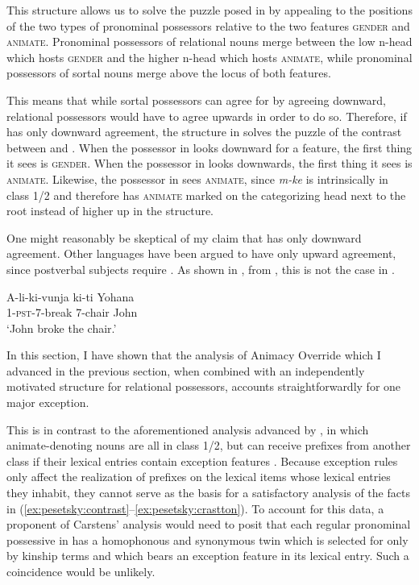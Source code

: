 \documentclass[output=paper,newtxmath,modfonts,nonflat,hidelinks]{langsci/langscibook}
\begin{document}
This structure allows us to solve the puzzle posed in  by appealing to the positions of the two types of pronominal possessors relative to the two features \textsc{gender} and \textsc{animate}. Pronominal possessors of relational nouns merge between the low n-head which hosts \textsc{gender} and the higher n-head which hosts \textsc{animate}, while pronominal possessors of sortal nouns merge above the locus of both features. 

This means that while sortal possessors can agree for  by agreeing downward, relational possessors would have to agree upwards in order to do so.  Therefore, if  has only downward agreement, the structure in  solves the puzzle of the contrast between  and . When the possessor in  looks downward for a  feature, the first thing it sees is \textsc{gender}.  When the possessor in  looks downwards, the first thing it sees is \textsc{animate}.  Likewise, the possessor in  sees \textsc{animate}, since \textit{m-ke} is intrinsically in class 1/2 and therefore has \textsc{animate} marked on the categorizing head next to the root instead of higher up in the structure. 

One might reasonably be skeptical of my claim that  has only downward agreement.  Other  languages have been argued to have only upward agreement, since postverbal subjects require . As shown in , from \citet{taniguchi13}, this is not the case in .

\ea\label{ex:pesetsky:realagreement}
{ \gll A-li-ki-vunja ki-ti Yohana \\
 \textsc{1}-\textsc{pst}-\textsc{7}-break \textsc{7}-chair John 
 \\ \glt `John broke the chair.' } \z 


In this section, I have shown that the analysis of Animacy Override which I advanced in the previous section, when combined with an independently motivated structure for relational possessors, accounts straightforwardly for one major exception.  

This is in contrast to the aforementioned analysis advanced by \citet{carstens91}, in which animate-denoting nouns are all in class 1/2, but can receive prefixes from another class if their lexical entries contain exception features .  Because exception rules only affect the realization of prefixes on the lexical items whose lexical entries they inhabit, they cannot serve as the basis for a satisfactory analysis of the facts in (\ref{ex:pesetsky:contrast}–\ref{ex:pesetsky:crastton}).  To account for this data, a proponent of Carstens' analysis would need to posit that each regular pronominal possessive in  has a homophonous and synonymous twin which is selected for only by kinship terms and which bears an exception feature in its lexical entry.  Such a coincidence would be unlikely. 
\end{document}
